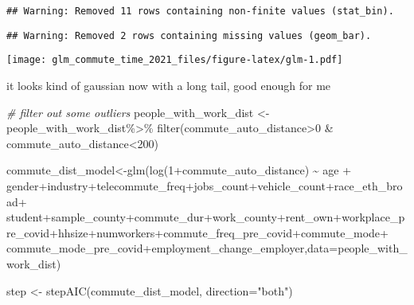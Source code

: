 \documentclass[
]{article}
\newenvironment{Shaded}{\begin{snugshade}}{\end{snugshade}}
\newcommand{\AttributeTok}[1]{\textcolor[rgb]{0.77,0.63,0.00}{#1}}
\newcommand{\CommentTok}[1]{\textcolor[rgb]{0.56,0.35,0.01}{\textit{#1}}}
\newcommand{\DecValTok}[1]{\textcolor[rgb]{0.00,0.00,0.81}{#1}}
\newcommand{\FunctionTok}[1]{\textcolor[rgb]{0.00,0.00,0.00}{#1}}
\newcommand{\NormalTok}[1]{#1}
\newcommand{\OtherTok}[1]{\textcolor[rgb]{0.56,0.35,0.01}{#1}}
\newcommand{\SpecialCharTok}[1]{\textcolor[rgb]{0.00,0.00,0.00}{#1}}
\newcommand{\StringTok}[1]{\textcolor[rgb]{0.31,0.60,0.02}{#1}}
\begin{document}
\begin{verbatim}
## Warning: Removed 11 rows containing non-finite values (stat_bin).
\end{verbatim}

\begin{verbatim}
## Warning: Removed 2 rows containing missing values (geom_bar).
\end{verbatim}

\texttt{[image: glm\_commute\_time\_2021\_files/figure-latex/glm-1.pdf]}

it looks kind of gaussian now with a long tail, good enough for me

\begin{Shaded}
\begin{Highlighting}[]
\CommentTok{\# filter out some outliers}
\NormalTok{people\_with\_work\_dist }\OtherTok{\textless{}{-}}\NormalTok{ people\_with\_work\_dist}\SpecialCharTok{\%\textgreater{}\%} \FunctionTok{filter}\NormalTok{(commute\_auto\_distance}\SpecialCharTok{\textgreater{}}\DecValTok{0} \SpecialCharTok{\&}\NormalTok{ commute\_auto\_distance}\SpecialCharTok{\textless{}}\DecValTok{200}\NormalTok{)}
\end{Highlighting}
\end{Shaded}

\begin{Shaded}
\begin{Highlighting}[]
\NormalTok{commute\_dist\_model}\OtherTok{\textless{}{-}}\FunctionTok{glm}\NormalTok{(}\FunctionTok{log}\NormalTok{(}\DecValTok{1}\SpecialCharTok{+}\NormalTok{commute\_auto\_distance) }\SpecialCharTok{\textasciitilde{}}\NormalTok{ age }\SpecialCharTok{+}\NormalTok{ gender}\SpecialCharTok{+}\NormalTok{industry}\SpecialCharTok{+}\NormalTok{telecommute\_freq}\SpecialCharTok{+}\NormalTok{jobs\_count}\SpecialCharTok{+}\NormalTok{vehicle\_count}\SpecialCharTok{+}\NormalTok{race\_eth\_broad}\SpecialCharTok{+}
\NormalTok{                          student}\SpecialCharTok{+}\NormalTok{sample\_county}\SpecialCharTok{+}\NormalTok{commute\_dur}\SpecialCharTok{+}\NormalTok{work\_county}\SpecialCharTok{+}\NormalTok{rent\_own}\SpecialCharTok{+}\NormalTok{workplace\_pre\_covid}\SpecialCharTok{+}\NormalTok{hhsize}\SpecialCharTok{+}\NormalTok{numworkers}\SpecialCharTok{+}\NormalTok{commute\_freq\_pre\_covid}\SpecialCharTok{+}\NormalTok{commute\_mode}\SpecialCharTok{+}\NormalTok{ commute\_mode\_pre\_covid}\SpecialCharTok{+}\NormalTok{employment\_change\_employer,}\AttributeTok{data=}\NormalTok{people\_with\_work\_dist)}

\NormalTok{step }\OtherTok{\textless{}{-}} \FunctionTok{stepAIC}\NormalTok{(commute\_dist\_model, }\AttributeTok{direction=}\StringTok{"both"}\NormalTok{)}
\end{Highlighting}
\end{Shaded}
\end{document}
